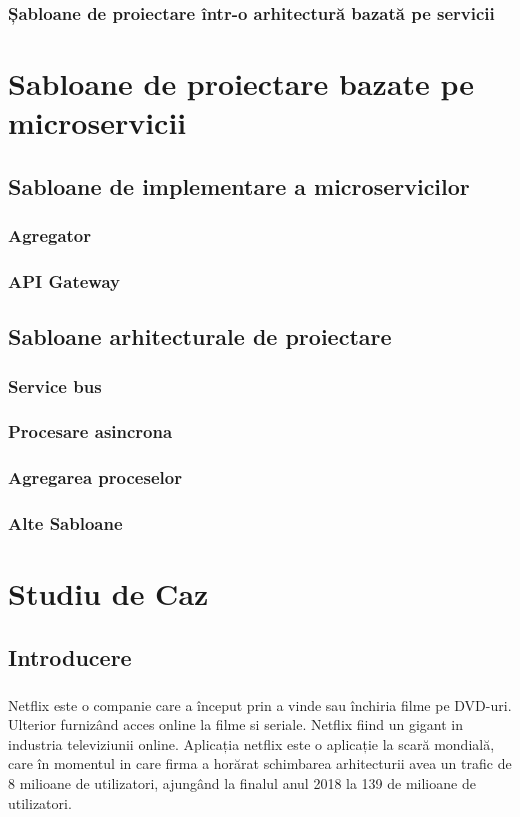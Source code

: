 \documentclass[12pt]{report}
\begin{document}
  	\subsection{Șabloane de proiectare într-o arhitectură bazată pe servicii}
\chapter{Sabloane de proiectare bazate pe microservicii}
	\section{Sabloane de implementare a microservicilor}
		\subsection{Agregator}
		\subsection{API Gateway}
	\section{Sabloane arhitecturale de proiectare}
		\subsection{Service bus}
		\subsection{Procesare asincrona}
		\subsection{Agregarea proceselor}
		\subsection{Alte Sabloane}
\chapter{Studiu de Caz}
	\section{Introducere}
	\paragraph{}Netflix este o companie care a început prin a vinde sau închiria filme pe DVD-uri. Ulterior furnizând acces online la filme si seriale. Netflix fiind un gigant in industria televiziunii online. Aplicația netflix este o aplicație la scară mondială, care în momentul in care firma a horărat schimbarea arhitecturii avea un trafic de 8 milioane de utilizatori, ajungând la finalul anul 2018 la 139 de milioane de utilizatori.	
\end{document}
